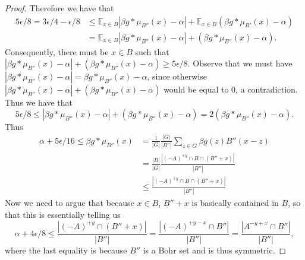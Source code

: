 \documentclass[11pt]{article}
\theoremstyle{definition}
\begin{document}
\begin{proof}
Therefore we have that 
\begin{align*}
5\epsilon/8=3\epsilon/4-\epsilon/8&\leq \mathbb{E}_{x\in B}|\beta g\ast \mu_{B''}(x)-\alpha| + \mathbb{E}_{x\in B}(\beta g\ast \mu_{B'}(x)-\alpha)\\
&=\mathbb{E}_{x\in B}|\beta g\ast \mu_{B''}(x)-\alpha| + (\beta g\ast \mu_{B''}(x)-\alpha).
\end{align*}
Consequently, there must be $x\in B$ such that $|\beta g\ast \mu_{B''}(x)-\alpha| + (\beta g\ast \mu_{B''}(x)-\alpha)\geq 5\epsilon/8$. Observe that we must have $|\beta g\ast \mu_{B''}(x)-\alpha| = \beta g\ast \mu_{B''}(x)-\alpha$, since otherwise $|\beta g\ast \mu_{B''}(x)-\alpha| + (\beta g\ast \mu_{B''}(x)-\alpha)$ would be equal to $0$, a contradiction.  Thus we have that 
$$
5\epsilon/8\leq |\beta g\ast \mu_{B''}(x)-\alpha| + (\beta g\ast \mu_{B''}(x)-\alpha)=2(\beta g\ast \mu_{B''}(x)-\alpha).
$$
Thus
\begin{align*}
\alpha+5\epsilon/16 \leq \beta g\ast \mu_{B''}(x)&=\frac{1}{|G|}\frac{|G|}{|B''|}\sum_{z\in G}\beta g(z)B''(x-z)\\
&=\frac{|B|}{|G|} \frac{|(-A)^{+y}\cap B\cap (B''+x)|}{|B''|}\\
&\leq  \frac{|(-A)^{+y}\cap B\cap (B''+x)|}{|B''|}
\end{align*}
Now we need to argue that because $x\in B$, $B''+x$ is basically contained in $B$, so that this is essentially telling us 
$$
\alpha+4\epsilon/8\leq \frac{|(-A)^{+y}\cap (B''+x)|}{|B''|}=\frac{|(-A)^{+y-x}\cap  B''|}{|B''|}=\frac{|A^{-y+x}\cap  B''|}{|B''|},
$$
where the last equality is because $B''$ is a Bohr set and is thus symmetric.
\end{proof}
\end{document}
